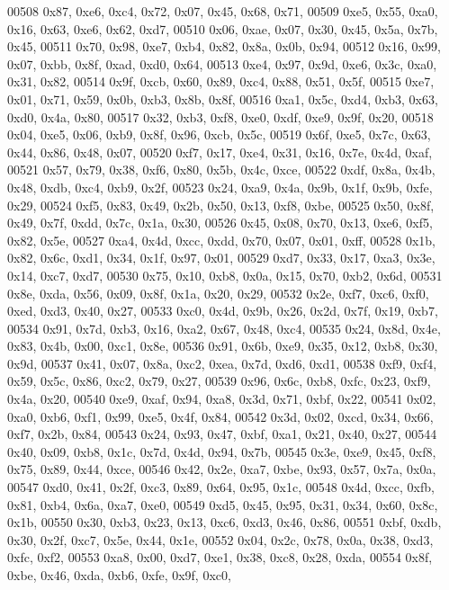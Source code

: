 \begin{DoxyCode}
00508   0x87, 0xe6, 0xc4, 0x72, 0x07, 0x45, 0x68, 0x71,
00509   0xe5, 0x55, 0xa0, 0x16, 0x63, 0xe6, 0x62, 0xd7,
00510   0x06, 0xae, 0x07, 0x30, 0x45, 0x5a, 0x7b, 0x45,
00511   0x70, 0x98, 0xe7, 0xb4, 0x82, 0x8a, 0x0b, 0x94,
00512   0x16, 0x99, 0x07, 0xbb, 0x8f, 0xad, 0xd0, 0x64,
00513   0xe4, 0x97, 0x9d, 0xe6, 0x3c, 0xa0, 0x31, 0x82,
00514   0x9f, 0xcb, 0x60, 0x89, 0xc4, 0x88, 0x51, 0x5f,
00515   0xe7, 0x01, 0x71, 0x59, 0x0b, 0xb3, 0x8b, 0x8f,
00516   0xa1, 0x5c, 0xd4, 0xb3, 0x63, 0xd0, 0x4a, 0x80,
00517   0x32, 0xb3, 0xf8, 0xe0, 0xdf, 0xe9, 0x9f, 0x20,
00518   0x04, 0xe5, 0x06, 0xb9, 0x8f, 0x96, 0xcb, 0x5c,
00519   0x6f, 0xe5, 0x7c, 0x63, 0x44, 0x86, 0x48, 0x07,
00520   0xf7, 0x17, 0xe4, 0x31, 0x16, 0x7e, 0x4d, 0xaf,
00521   0x57, 0x79, 0x38, 0xf6, 0x80, 0x5b, 0x4c, 0xce,
00522   0xdf, 0x8a, 0x4b, 0x48, 0xdb, 0xc4, 0xb9, 0x2f,
00523   0x24, 0xa9, 0x4a, 0x9b, 0x1f, 0x9b, 0xfe, 0x29,
00524   0xf5, 0x83, 0x49, 0x2b, 0x50, 0x13, 0xf8, 0xbe,
00525   0x50, 0x8f, 0x49, 0x7f, 0xdd, 0x7c, 0x1a, 0x30,
00526   0x45, 0x08, 0x70, 0x13, 0xe6, 0xf5, 0x82, 0x5e,
00527   0xa4, 0x4d, 0xcc, 0xdd, 0x70, 0x07, 0x01, 0xff,
00528   0x1b, 0x82, 0x6c, 0xd1, 0x34, 0x1f, 0x97, 0x01,
00529   0xd7, 0x33, 0x17, 0xa3, 0x3e, 0x14, 0xc7, 0xd7,
00530   0x75, 0x10, 0xb8, 0x0a, 0x15, 0x70, 0xb2, 0x6d,
00531   0x8e, 0xda, 0x56, 0x09, 0x8f, 0x1a, 0x20, 0x29,
00532   0x2e, 0xf7, 0xc6, 0xf0, 0xed, 0xd3, 0x40, 0x27,
00533   0xc0, 0x4d, 0x9b, 0x26, 0x2d, 0x7f, 0x19, 0xb7,
00534   0x91, 0x7d, 0xb3, 0x16, 0xa2, 0x67, 0x48, 0xc4,
00535   0x24, 0x8d, 0x4e, 0x83, 0x4b, 0x00, 0xc1, 0x8e,
00536   0x91, 0x6b, 0xe9, 0x35, 0x12, 0xb8, 0x30, 0x9d,
00537   0x41, 0x07, 0x8a, 0xc2, 0xea, 0x7d, 0xd6, 0xd1,
00538   0xf9, 0xf4, 0x59, 0x5c, 0x86, 0xc2, 0x79, 0x27,
00539   0x96, 0x6c, 0xb8, 0xfc, 0x23, 0xf9, 0x4a, 0x20,
00540   0xe9, 0xaf, 0x94, 0xa8, 0x3d, 0x71, 0xbf, 0x22,
00541   0x02, 0xa0, 0xb6, 0xf1, 0x99, 0xe5, 0x4f, 0x84,
00542   0x3d, 0x02, 0xcd, 0x34, 0x66, 0xf7, 0x2b, 0x84,
00543   0x24, 0x93, 0x47, 0xbf, 0xa1, 0x21, 0x40, 0x27,
00544   0x40, 0x09, 0xb8, 0x1c, 0x7d, 0x4d, 0x94, 0x7b,
00545   0x3e, 0xe9, 0x45, 0xf8, 0x75, 0x89, 0x44, 0xce,
00546   0x42, 0x2e, 0xa7, 0xbe, 0x93, 0x57, 0x7a, 0x0a,
00547   0xd0, 0x41, 0x2f, 0xc3, 0x89, 0x64, 0x95, 0x1c,
00548   0x4d, 0xcc, 0xfb, 0x81, 0xb4, 0x6a, 0xa7, 0xe0,
00549   0xd5, 0x45, 0x95, 0x31, 0x34, 0x60, 0x8c, 0x1b,
00550   0x30, 0xb3, 0x23, 0x13, 0xc6, 0xd3, 0x46, 0x86,
00551   0xbf, 0xdb, 0x30, 0x2f, 0xc7, 0x5e, 0x44, 0x1e,
00552   0x04, 0x2c, 0x78, 0x0a, 0x38, 0xd3, 0xfc, 0xf2,
00553   0xa8, 0x00, 0xd7, 0xe1, 0x38, 0xc8, 0x28, 0xda,
00554   0x8f, 0xbe, 0x46, 0xda, 0xb6, 0xfe, 0x9f, 0xc0,

\end{DoxyCode}
